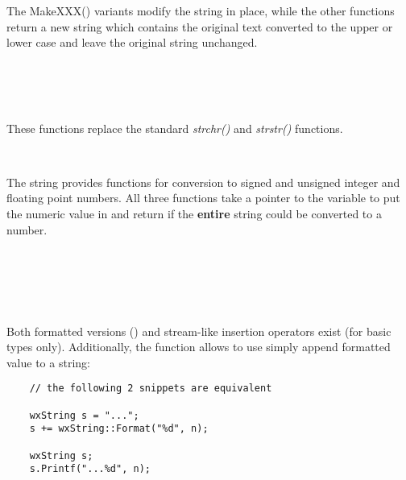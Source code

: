 \label{caseconversioninwxstring}

The MakeXXX() variants modify the string in place, while the other functions
return a new string which contains the original text converted to the upper or
lower case and leave the original string unchanged.

\\
\\
\\


\label{searchingandreplacinginwxstring}

These functions replace the standard {\it strchr()} and {\it strstr()} 
functions.

\\


\label{conversiontonumbersinwxstring}

The string provides functions for conversion to signed and unsigned integer and
floating point numbers. All three functions take a pointer to the variable to
put the numeric value in and return \true if the {\bf entire} string could be
converted to a number.

\\
\\
\\
\\


\label{writingintostringinwxstring}

Both formatted versions () and stream-like
insertion operators exist (for basic types only). Additionally, the 
 function allows to use simply append
formatted value to a string:

\begin{verbatim}
    // the following 2 snippets are equivalent

    wxString s = "...";
    s += wxString::Format("%d", n);

    wxString s;
    s.Printf("...%d", n);
\end{verbatim}

